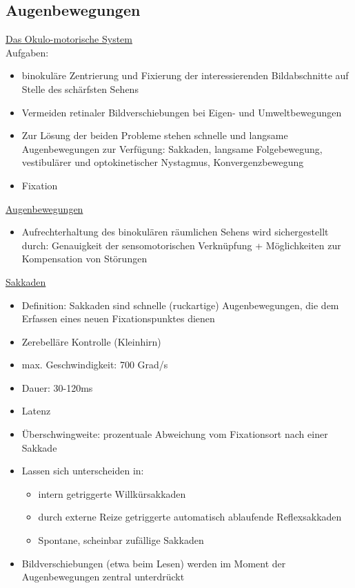 \documentclass[a4paper,10pt,oneside]{article}
\begin{document}
\subsection{Augenbewegungen}
\underline{Das Okulo-motorische System} \\
Aufgaben:
	\begin{itemize}
		\item binokuläre Zentrierung und Fixierung der interessierenden Bildabschnitte auf Stelle des schärfsten Sehens
		\item Vermeiden retinaler Bildverschiebungen bei Eigen- und Umweltbewegungen
		\item Zur Lösung der beiden Probleme stehen schnelle und langsame Augenbewegungen zur Verfügung: Sakkaden, langsame Folgebewegung, vestibulärer und optokinetischer Nystagmus, Konvergenzbewegung
		\item Fixation
	\end{itemize}
	
\underline{Augenbewegungen} \\
	\begin{itemize}
		\item Aufrechterhaltung des binokulären räumlichen Sehens wird sichergestellt durch: Genauigkeit der sensomotorischen Verknüpfung + Möglichkeiten zur Kompensation von Störungen
	\end{itemize}
	
\underline{Sakkaden} \\
	\begin{itemize}
		\item Definition: Sakkaden sind schnelle (ruckartige) Augenbewegungen, die dem Erfassen eines neuen Fixationspunktes dienen 
		\item Zerebelläre Kontrolle (Kleinhirn)
		\item max. Geschwindigkeit: 700 Grad/s
		\item Dauer: 30-120ms
		\item Latenz
		\item Überschwingweite: prozentuale Abweichung vom Fixationsort nach einer Sakkade
		\item Lassen sich unterscheiden in:
			\begin{itemize}
				\item intern getriggerte Willkürsakkaden 
				\item durch externe Reize getriggerte automatisch ablaufende Reflexsakkaden
				\item Spontane, scheinbar zufällige Sakkaden 
			\end{itemize}
		\item Bildverschiebungen (etwa beim Lesen) werden im Moment der Augenbewegungen zentral unterdrückt
	\end{itemize}
	
\end{document}
